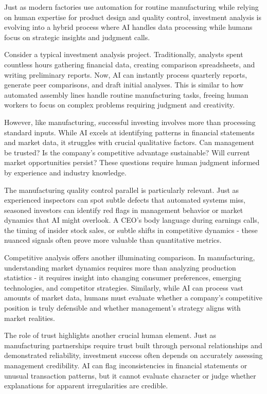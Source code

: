 \documentclass[
  Letterpaper,
]{scrbook}
\begin{document}
Just as modern factories use automation for routine manufacturing while
relying on human expertise for product design and quality control,
investment analysis is evolving into a hybrid process where AI handles
data processing while humans focus on strategic insights and judgment
calls.

Consider a typical investment analysis project. Traditionally, analysts
spent countless hours gathering financial data, creating comparison
spreadsheets, and writing preliminary reports. Now, AI can instantly
process quarterly reports, generate peer comparisons, and draft initial
analyses. This is similar to how automated assembly lines handle routine
manufacturing tasks, freeing human workers to focus on complex problems
requiring judgment and creativity.

However, like manufacturing, successful investing involves more than
processing standard inputs. While AI excels at identifying patterns in
financial statements and market data, it struggles with crucial
qualitative factors. Can management be trusted? Is the company's
competitive advantage sustainable? Will current market opportunities
persist? These questions require human judgment informed by experience
and industry knowledge.

The manufacturing quality control parallel is particularly relevant.
Just as experienced inspectors can spot subtle defects that automated
systems miss, seasoned investors can identify red flags in management
behavior or market dynamics that AI might overlook. A CEO's body
language during earnings calls, the timing of insider stock sales, or
subtle shifts in competitive dynamics - these nuanced signals often
prove more valuable than quantitative metrics.

Competitive analysis offers another illuminating comparison. In
manufacturing, understanding market dynamics requires more than
analyzing production statistics - it requires insight into changing
consumer preferences, emerging technologies, and competitor strategies.
Similarly, while AI can process vast amounts of market data, humans must
evaluate whether a company's competitive position is truly defensible
and whether management's strategy aligns with market realities.

The role of trust highlights another crucial human element. Just as
manufacturing partnerships require trust built through personal
relationships and demonstrated reliability, investment success often
depends on accurately assessing management credibility. AI can flag
inconsistencies in financial statements or unusual transaction patterns,
but it cannot evaluate character or judge whether explanations for
apparent irregularities are credible.
\end{document}
